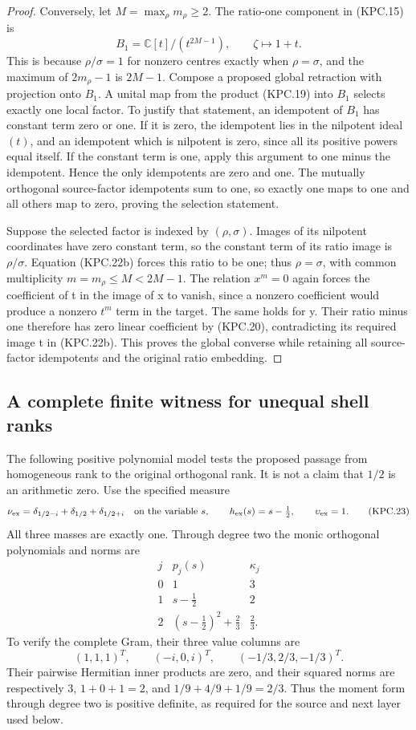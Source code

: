 \begin{proof}
Conversely, let \(M=\max_\rho m_\rho\ge2\).
The ratio-one component in (KPC.15) is
\[
 B_1=\mathbb C[t]/(t^{2M-1}),\qquad
        \zeta\longmapsto1+t.
 \tag{KPC.22b}
\]
This is because \(\rho/\sigma=1\) for nonzero centres
exactly when \(\rho=\sigma\), and the maximum of
\(2m_\rho-1\) is \(2M-1\).
Compose a proposed global retraction with projection onto
\(B_1\).  A unital map from the product (KPC.19) into
\(B_1\) selects exactly one local factor.  To justify
that statement, an idempotent of \(B_1\) has constant
term zero or one.  If it is zero, the idempotent lies in
the nilpotent ideal \((t)\), and an idempotent which is
nilpotent is zero, since all its positive powers equal
itself.  If the constant term is one, apply this argument
to one minus the idempotent.  Hence the only idempotents
are zero and one.  The mutually orthogonal source-factor
idempotents sum to one, so exactly one maps to one and
all others map to zero, proving the selection statement.

Suppose the selected factor is indexed by \((\rho,\sigma)\).
Images of its nilpotent coordinates have zero constant term,
so the constant term of its ratio image is \(\rho/\sigma\).
Equation (KPC.22b) forces this ratio to be one; thus
\(\rho=\sigma\), with common multiplicity
\(m=m_\rho\le M<2M-1\).  The relation \(x^m=0\)
again forces the coefficient of t in the image of x to
vanish, since a nonzero coefficient would produce a
nonzero \(t^m\) term in the target.  The same holds for y.
Their ratio minus one therefore has zero linear coefficient
by (KPC.20), contradicting its required image t in
(KPC.22b).  This proves the global converse while retaining
all source-factor idempotents and the original ratio embedding.
\end{proof}

\subsection{A complete finite witness for unequal shell ranks}

The following positive polynomial model tests the proposed passage
from homogeneous rank to the original orthogonal rank.  It is not
a claim that \(1/2\) is an arithmetic zero.  Use the specified
measure
\[
 \nu_{\rm ex}=\delta_{1/2-i}+\delta_{1/2}+\delta_{1/2+i}
 \quad\hbox{on the variable }s,\qquad
 h_{\rm ex}(s)=s-\tfrac12,\qquad \upsilon_{\rm ex}=1.
 \tag{KPC.23}
\]
All three masses are exactly one.  Through degree two the monic
orthogonal polynomials and norms are
\[
 \begin{array}{c|c|c}
 j&p_j(s)&\kappa_j\\\hline
 0&1&3\\
 1&s-\tfrac12&2\\
 2&(s-\tfrac12)^2+\tfrac23&\tfrac23.
 \end{array}
 \tag{KPC.24}
\]
To verify the complete Gram, their three value columns are
\[
 (1,1,1)^T,\qquad (-i,0,i)^T,\qquad(-1/3,2/3,-1/3)^T.
\]
Their pairwise Hermitian inner
products are zero, and their squared norms are respectively
\(3\), \(1+0+1=2\), and
\(1/9+4/9+1/9=2/3\).  Thus the moment form through degree
two is positive definite, as required for the source and next
layer used below.

